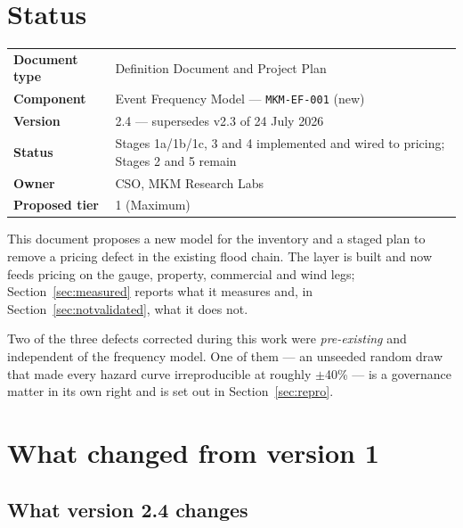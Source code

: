 \documentclass[11pt]{article}
\begin{document}
\sloppy

\mkmtitlepage
\mkmlegalpage

\tableofcontents
\clearpage

\section*{Status}

\noindent
\begin{tabular}{ll}
\textbf{Document type} & Definition Document and Project Plan \\
\textbf{Component}     & Event Frequency Model --- \texttt{MKM-EF-001} (new) \\
\textbf{Version}       & 2.4 --- supersedes v2.3 of 24 July 2026 \\
\textbf{Status}        & Stages 1a/1b/1c, 3 and 4 implemented and wired to pricing; Stages 2 and 5 remain \\
\textbf{Owner}         & CSO, MKM Research Labs \\
\textbf{Proposed tier} & 1 (Maximum) \\
\end{tabular}

\vspace{1em}
\noindent This document proposes a new model for the inventory and a staged
plan to remove a pricing defect in the existing flood chain. The layer is built
and now feeds pricing on the gauge, property, commercial and wind legs;
Section~\ref{sec:measured} reports what it measures and, in
Section~\ref{sec:notvalidated}, what it does not.

\vspace{0.5em}
\noindent Two of the three defects corrected during this work were
\emph{pre-existing} and independent of the frequency model. One of them --- an
unseeded random draw that made every hazard curve irreproducible at roughly
$\pm$40\% --- is a governance matter in its own right and is set out in
Section~\ref{sec:repro}.

\clearpage

\section{What changed from version 1}

\subsection{What version 2.4 changes}
\end{document}

